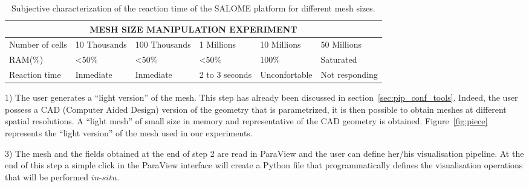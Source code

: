 \begin{table}
\centering
\begin{tabular}{|p{1.5cm}|p{2.5cm}|p{2.50cm}|p{1.50cm}|p{1.50cm}|p{1.50cm}|}
\hline
\multicolumn{6}{|c|}{\textbf{MESH SIZE MANIPULATION EXPERIMENT}}\\
\hline
Number of cells & 10 Thousands & 100 Thousands & 1 Millions & 10 Millions & 50 Millions \\
\hline
RAM(\%) & <50\% & <50\% & <50\% & 100\% & Saturated \\
\hline
Reaction time & Inmediate & Inmediate & 2 to 3 seconds & Unconfortable & Not responding \\
\hline
\end{tabular}
\caption{Subjective characterization of the reaction time of the SALOME platform for different mesh sizes.}
\label{fig:tab}
\vspace{-0.15in}
\end{table}


1) The user generates a ``light version'' of the mesh. This step has already been
discussed in section~\ref{sec:pip_conf_tools}. Indeed, the user possess a CAD (Computer Aided
Design) version of the geometry that is parametrized, it is then possible to
obtain meshes at different spatial resolutions. A ``light mesh'' of small size in
memory and representative of the CAD geometry is obtained. Figure~\ref{fig:piece} represents
the ``light version'' of the mesh used in our experiments.


3) The mesh and the fields obtained at the end of step 2 are read in ParaView
and the user can define her/his visualisation pipeline. At the end of this step
a simple click in the ParaView interface will create a Python file that
programmatically defines the visualisation operations that will be performed
$in$-$situ$.






